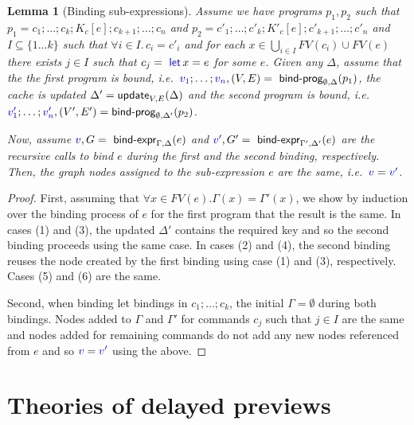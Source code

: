\documentclass[english,crc,references=cleveref]{programming}
\newcounter{thc}
\theoremstyle{plain}
\newtheorem{lem}[thc]{Lemma}
\theoremstyle{definition}
\newcommand{\ident}[1]{\textnormal{\textcolor{idclr}{\sffamily #1}}}
\newcommand{\kvd}[1]{\textnormal{\textcolor{kvdclr}{\sffamily #1}}}
\newcommand{\bndclr}[1]{\textcolor{kvdclr}{#1}}
\begin{document}
\begin{lem}[Binding sub-expressions]
\label{thm:sub-expr}
Assume we have programs $p_1, p_2$ such that $p_1 = c_1; \ldots; c_k; K_c[e]; c_{k+1};\ldots; c_n$ and
$p_2 = c'_1; \ldots; c'_k; K'_c[e]; c'_{k+1};\ldots;c'_n$ and $I\subseteq \{1\ldots k\}$ such
that $\forall i\!\in\!I.\,c_i\!=\!c'_i$ and for each $x \in \bigcup_{i\in I}FV(c_i) \cup FV(e)$
there exists $j\in I$ such that $c_j = \kvd{let}\,x=e$ for some $e$.
%
Given any $\Delta$, assume that the the first program is bound,
i.\hairspace e.~$\bndclr{v_1};\ldots;\bndclr{v_n}, (V, E) = \ident{bind-prog}_{\emptyset, \Delta}(p_1)$,
the cache is updated $\Delta' = \ident{update}_{V, E}(\Delta)$ and the second
program is bound,
i.\hairspace e.~$\bndclr{v'_1};\ldots;\bndclr{v'_n}, (V', E') = \ident{bind-prog}_{\emptyset, \Delta'}(p_2)$.

Now, assume $\bndclr{v}, G = \ident{bind-expr}_{\Gamma, \Delta}(e)$ and
$\bndclr{v'}, G' = \ident{bind-expr}_{\Gamma', \Delta'}(e)$ are the recursive calls to bind
$e$ during the first and the second binding, respectively. Then, the graph nodes assigned to the
sub-expression $e$ are the same, i.\hairspace e.~$\bndclr{v} = \bndclr{v'}$.
\end{lem}
\begin{proof}
First, assuming that $\forall x\in FV(e). \Gamma(x) = \Gamma'(x)$, we show by induction over the binding process of $e$
for the first program that the result is the same. In cases (1) and (3), the updated $\Delta'$
contains the required key and so the second binding proceeds using the same case. In cases
(2) and (4), the second binding reuses the node created by the first binding using case (1) and
(3), respectively. Cases (5) and (6) are the same.

Second, when binding let bindings in $c_1; \ldots; c_k$, the initial $\Gamma = \emptyset$ during
both bindings. Nodes added to $\Gamma$ and $\Gamma'$ for commands $c_j$ such that $j\in I$ are
the same and nodes added for remaining commands do not add any new nodes referenced from $e$ and
so $\bndclr{v} = \bndclr{v'}$ using the above.
\end{proof}



\section{Theories of delayed previews}
\label{sec:app-theories}
\end{document}
